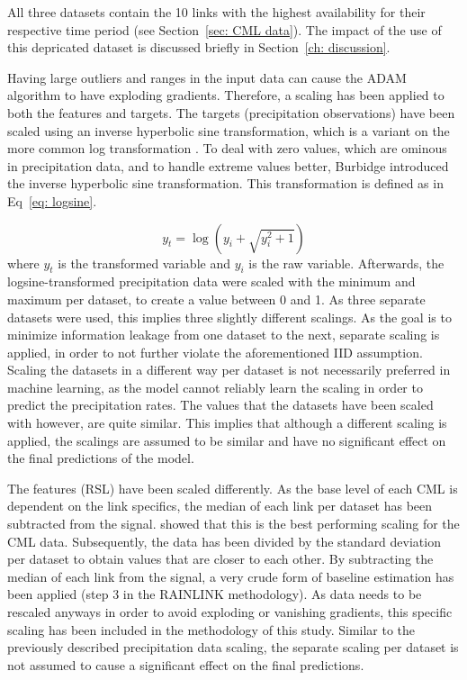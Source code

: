 \documentclass[twocolumn, 10pt, a4paper]{memoir}
\begin{document}
	All three datasets contain the 10 links with the highest availability for their respective time period (see Section~\ref{sec: CML data}). The impact of the use of this depricated dataset is discussed briefly in Section~\ref{ch: discussion}.
	
	Having large outliers and ranges in the input data can cause the ADAM algorithm to have exploding gradients. Therefore, a scaling has been applied to both the features and targets. 
	The targets (precipitation observations) have been scaled using an inverse hyperbolic sine transformation, which is a variant on the more common log transformation \cite{Kilmartin1972}. To deal with zero values, which are ominous in precipitation data, and to handle extreme values better, Burbidge  introduced the inverse hyperbolic sine transformation. This transformation is defined as in Eq~\ref{eq: logsine}.
	
	\begin{equation}
		\label{eq: logsine}
		y_t = \log(y_i + \sqrt{y_i^2 + 1})
	\end{equation}
	where $y_t$ is the transformed variable and $y_i$ is the raw variable.
	Afterwards, the logsine-transformed precipitation data were scaled with the minimum and maximum per dataset, to create a value between 0 and 1. As three separate datasets were used, this implies three slightly different scalings. As the goal is to minimize information leakage from one dataset to the next, separate scaling is applied, in order to not further violate the aforementioned IID assumption. Scaling the datasets in a different way per dataset is not necessarily preferred in machine learning, as the model cannot reliably learn the scaling in order  to predict the precipitation rates. The values that the datasets have been scaled with however, are quite similar. This implies that although a different scaling is applied, the scalings are assumed to be similar and have no significant effect on the final predictions of the model.
	
	The features (RSL) have been scaled differently. As the base level of each CML is dependent on the link specifics, the median of each link per dataset has been subtracted from the signal.  showed that this is the best performing scaling for the CML data. Subsequently, the data has been divided by the standard deviation per dataset to obtain values that are closer to each other. By subtracting the median of each link from the signal, a very crude form of baseline estimation has been applied (step 3 in the RAINLINK methodology). As data needs to be rescaled anyways in order to avoid exploding or vanishing gradients, this specific scaling has been included in the methodology of this study. Similar to the previously described precipitation data scaling, the separate scaling per dataset is not assumed to cause a significant effect on the final predictions. 
	
\end{document}

